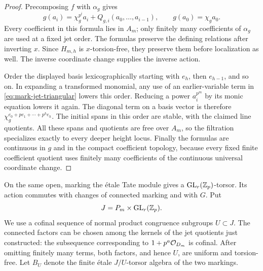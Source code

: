 \begin{proof}
Precomposing $f$ with $\alpha_g$ gives
\begin{equation}
 g(a_i)=\chi_g^{p^i}a_i+Q_{g,i}(a_0,\ldots,a_{i-1}),
 \qquad g(a_0)=\chi_ga_0.
 \label{eq:mark-jet-triangular}
\end{equation}
Every coefficient in this formula lies in $A_m$; only finitely many
coefficients of $\alpha_g$ are used at a fixed jet order.  The formulas
preserve the defining relations after inverting $x$.  Since
$H_{m,h}$ is $x$-torsion-free, they preserve them before localization
as well.  The inverse coordinate change supplies the inverse action.

Order the displayed basis lexicographically starting with $e_h$, then
$e_{h-1}$, and so on.  In expanding a transformed monomial, any use of
an earlier-variable term in \cref{eq:mark-jet-triangular} lowers this
order.  Reducing a power $a_i^{p^m}$ by its monic equation lowers it
again.  The diagonal term on a basis vector is therefore
$\chi_g^{e_0+pe_1+\cdots+p^he_h}$.  The initial spans in this order are
stable, with the claimed line quotients.  All these spans and
quotients are free over $A_m$, so the filtration specializes exactly
to every deeper height locus.  Finally the formulas are continuous
in $g$ and in the compact coefficient topology, because every fixed
finite coefficient quotient uses finitely many coefficients of the
continuous universal coordinate change.
\end{proof}

On the same open, marking the \'{e}tale Tate module gives a
$\operatorname{GL}_r(\mathbb Z_p)$-torsor.  Its action commutes with changes of connected
marking and with $G$.  Put
\[
 J=P_m\times\operatorname{GL}_r(\mathbb Z_p).
\]
We use a cofinal sequence of normal product congruence subgroups
$U\subset J$.  The connected factors can be chosen among the kernels
of the jet quotients just constructed: the subsequence corresponding
to $1+p^a\mathcal O_{D_m}$ is cofinal.  After omitting finitely many terms,
both factors, and hence $U$, are uniform and torsion-free.  Let $B_U$
denote the finite \'{e}tale $J/U$-torsor algebra of the two markings.


